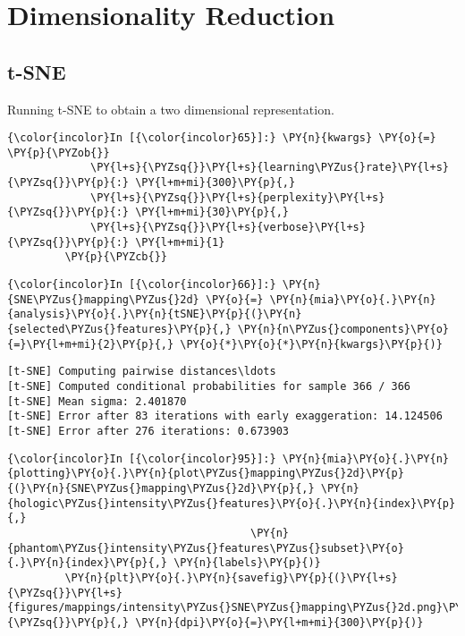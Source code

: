     \section{Dimensionality Reduction}\label{dimensionality-reduction}

\subsection{t-SNE}\label{t-sne}

Running t-SNE to obtain a two dimensional representation.

    \begin{Verbatim}[commandchars=\\\{\}]
{\color{incolor}In [{\color{incolor}65}]:} \PY{n}{kwargs} \PY{o}{=} \PY{p}{\PYZob{}}
             \PY{l+s}{\PYZsq{}}\PY{l+s}{learning\PYZus{}rate}\PY{l+s}{\PYZsq{}}\PY{p}{:} \PY{l+m+mi}{300}\PY{p}{,}
             \PY{l+s}{\PYZsq{}}\PY{l+s}{perplexity}\PY{l+s}{\PYZsq{}}\PY{p}{:} \PY{l+m+mi}{30}\PY{p}{,}
             \PY{l+s}{\PYZsq{}}\PY{l+s}{verbose}\PY{l+s}{\PYZsq{}}\PY{p}{:} \PY{l+m+mi}{1}
         \PY{p}{\PYZcb{}}
\end{Verbatim}

    \begin{Verbatim}[commandchars=\\\{\}]
{\color{incolor}In [{\color{incolor}66}]:} \PY{n}{SNE\PYZus{}mapping\PYZus{}2d} \PY{o}{=} \PY{n}{mia}\PY{o}{.}\PY{n}{analysis}\PY{o}{.}\PY{n}{tSNE}\PY{p}{(}\PY{n}{selected\PYZus{}features}\PY{p}{,} \PY{n}{n\PYZus{}components}\PY{o}{=}\PY{l+m+mi}{2}\PY{p}{,} \PY{o}{*}\PY{o}{*}\PY{n}{kwargs}\PY{p}{)}
\end{Verbatim}

    \begin{Verbatim}[commandchars=\\\{\}]
[t-SNE] Computing pairwise distances\ldots
[t-SNE] Computed conditional probabilities for sample 366 / 366
[t-SNE] Mean sigma: 2.401870
[t-SNE] Error after 83 iterations with early exaggeration: 14.124506
[t-SNE] Error after 276 iterations: 0.673903
    \end{Verbatim}

    \begin{Verbatim}[commandchars=\\\{\}]
{\color{incolor}In [{\color{incolor}95}]:} \PY{n}{mia}\PY{o}{.}\PY{n}{plotting}\PY{o}{.}\PY{n}{plot\PYZus{}mapping\PYZus{}2d}\PY{p}{(}\PY{n}{SNE\PYZus{}mapping\PYZus{}2d}\PY{p}{,} \PY{n}{hologic\PYZus{}intensity\PYZus{}features}\PY{o}{.}\PY{n}{index}\PY{p}{,}
                                      \PY{n}{phantom\PYZus{}intensity\PYZus{}features\PYZus{}subset}\PY{o}{.}\PY{n}{index}\PY{p}{,} \PY{n}{labels}\PY{p}{)}
         \PY{n}{plt}\PY{o}{.}\PY{n}{savefig}\PY{p}{(}\PY{l+s}{\PYZsq{}}\PY{l+s}{figures/mappings/intensity\PYZus{}SNE\PYZus{}mapping\PYZus{}2d.png}\PY{l+s}{\PYZsq{}}\PY{p}{,} \PY{n}{dpi}\PY{o}{=}\PY{l+m+mi}{300}\PY{p}{)}
\end{Verbatim}

